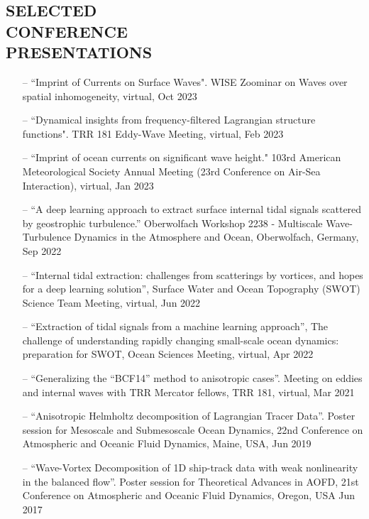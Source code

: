 \documentclass[margin]{res}
\begin{document}
\begin{resume}
\section{{\normalfont SELECTED\\CONFERENCE\\ PRESENTATIONS}}
\begin{itemize}[leftmargin=*,noitemsep]
\item[--]``Imprint of Currents on Surface Waves".  WISE Zoominar on Waves over spatial inhomogeneity, virtual, Oct 2023
\item[--]``Dynamical insights from frequency-filtered Lagrangian structure functions". TRR 181 Eddy-Wave Meeting, virtual, Feb 2023
\item[--] ``Imprint of ocean currents on significant wave height." 103rd American Meteorological Society Annual Meeting (23rd Conference on Air-Sea Interaction), virtual, Jan 2023
\item[--] “A deep learning approach to extract surface internal tidal signals scattered by geostrophic turbulence.”  Oberwolfach Workshop 2238 - Multiscale Wave-Turbulence Dynamics in the Atmosphere and Ocean, Oberwolfach, Germany, Sep 2022
\item[--] “Internal tidal extraction: challenges from scatterings by vortices, and hopes for a deep learning solution”, Surface Water and Ocean Topography (SWOT) Science Team Meeting, virtual, Jun 2022
\item[--] “Extraction of tidal signals from a machine learning approach”, The challenge of understanding rapidly changing small-scale ocean dynamics: preparation for SWOT, Ocean Sciences Meeting, virtual, Apr 2022
\item[--] “Generalizing the “BCF14” method to anisotropic cases”. Meeting on eddies and internal waves with TRR Mercator fellows, TRR 181, virtual, Mar 2021
\item[--] “Anisotropic Helmholtz decomposition of Lagrangian Tracer Data”. Poster session for Mesoscale and Submesoscale Ocean Dynamics, 22nd Conference on Atmospheric and Oceanic Fluid Dynamics, Maine, USA, Jun 2019
\item[--] “Wave-Vortex Decomposition of 1D ship-track data with weak nonlinearity in the balanced flow”. Poster session for Theoretical Advances in AOFD, 21st Conference on Atmospheric and Oceanic Fluid Dynamics, Oregon, USA Jun 2017
\end{itemize}

\end{resume}
\end{document}
